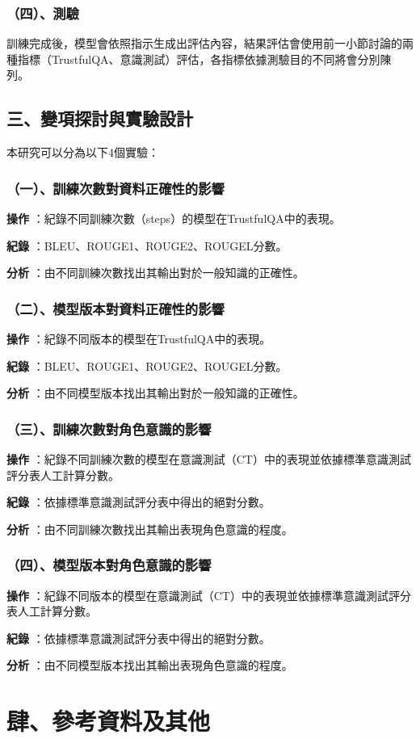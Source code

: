 \documentclass[12pt,a4paper,MingLiU,UTF8,natbib]{article}
\def\xeCJKembold{0.4}
\def\saveCJKnode{\dimen255\lastkern}
\def\restoreCJKnode{\kern-\dimen255\kern\dimen255}
\let\CJKoldsymbol\CJKsymbol
\let\CJKoldpunctsymbol\CJKpunctsymbol
\def\CJKfakeboldsymbol#1{%
	\special{pdf:literal direct 2 Tr \xeCJKembold\space w}%
	\CJKoldsymbol{#1}%
	\saveCJKnode
	\special{pdf:literal direct 0 Tr}%
	\restoreCJKnode}
\def\CJKfakeboldpunctsymbol#1{%
	\special{pdf:literal direct 2 Tr \xeCJKembold\space w}%
	\CJKoldpunctsymbol{#1}%
	\saveCJKnode
	\special{pdf:literal direct 0 Tr}%
	\restoreCJKnode}
\newcommand\CJKfakebold[1]{%
	\let\CJKsymbol\CJKfakeboldsymbol
	\let\CJKpunctsymbol\CJKfakeboldpunctsymbol
	#1%
	\let\CJKsymbol\CJKoldsymbol
	\let\CJKpunctsymbol\CJKoldpunctsymbol}
\begin{document}
	\subsubsection{（四）、測驗}
	訓練完成後，模型會依照指示生成出評估內容，結果評估會使用前一小節討論的兩種指標（TrustfulQA、意識測試）評估，各指標依據測驗目的不同將會分別陳列。
	\subsection{三、變項探討與實驗設計}
	本研究可以分為以下4個實驗：
	\subsubsection{（一）、訓練次數對資料正確性的影響}
	\CJKfakebold{\textbf{操作}}：紀錄不同訓練次數（steps）的模型在TrustfulQA中的表現。
	
	\CJKfakebold{\textbf{紀錄}}：BLEU、ROUGE1、ROUGE2、ROUGEL分數。
	
	\CJKfakebold{\textbf{分析}}：由不同訓練次數找出其輸出對於一般知識的正確性。
	
	\subsubsection{（二）、模型版本對資料正確性的影響}
	\CJKfakebold{\textbf{操作}}：紀錄不同版本的模型在TrustfulQA中的表現。

	\CJKfakebold{\textbf{紀錄}}：BLEU、ROUGE1、ROUGE2、ROUGEL分數。

	\CJKfakebold{\textbf{分析}}：由不同模型版本找出其輸出對於一般知識的正確性。
	
	\subsubsection{（三）、訓練次數對角色意識的影響}
	\CJKfakebold{\textbf{操作}}：紀錄不同訓練次數的模型在意識測試（CT）中的表現並依據標準意識測試評分表人工計算分數。

	\CJKfakebold{\textbf{紀錄}}：依據標準意識測試評分表中得出的絕對分數。

	\CJKfakebold{\textbf{分析}}：由不同訓練次數找出其輸出表現角色意識的程度。
	
	\subsubsection{（四）、模型版本對角色意識的影響}
	\CJKfakebold{\textbf{操作}}：紀錄不同版本的模型在意識測試（CT）中的表現並依據標準意識測試評分表人工計算分數。

	\CJKfakebold{\textbf{紀錄}}：依據標準意識測試評分表中得出的絕對分數。

	\CJKfakebold{\textbf{分析}}：由不同模型版本找出其輸出表現角色意識的程度。
	
	\section{肆、參考資料及其他}
	
	\renewcommand{\refname}{}
	
\end{document}
